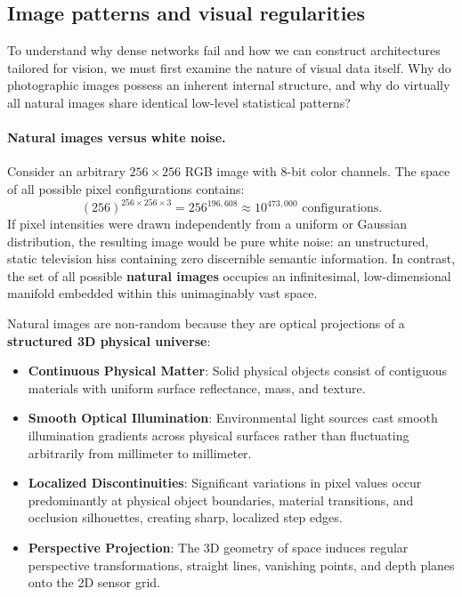 \subsection{Image patterns and visual regularities}
\label{sec:natural_image_statistics}

To understand why dense networks fail and how we can construct architectures tailored for vision, we must first examine the nature of visual data itself. Why do photographic images possess an inherent internal structure, and why do virtually all natural images share identical low-level statistical patterns?

\paragraph{Natural images versus white noise.}
Consider an arbitrary $256 \times 256$ RGB image with 8-bit color channels. The space of all possible pixel configurations contains:
\begin{equation}
(256)^{256 \times 256 \times 3} = 256^{196,608} \approx 10^{473,000} \text{ configurations}.
\end{equation}
If pixel intensities were drawn independently from a uniform or Gaussian distribution, the resulting image would be pure white noise: an unstructured, static television hiss containing zero discernible semantic information. In contrast, the set of all possible \textbf{natural images} occupies an infinitesimal, low-dimensional manifold embedded within this unimaginably vast space. 

Natural images are non-random because they are optical projections of a \textbf{structured 3D physical universe}:
\begin{itemize}[leftmargin=*]
  \item \textbf{Continuous Physical Matter}: Solid physical objects consist of contiguous materials with uniform surface reflectance, mass, and texture.
  \item \textbf{Smooth Optical Illumination}: Environmental light sources cast smooth illumination gradients across physical surfaces rather than fluctuating arbitrarily from millimeter to millimeter.
  \item \textbf{Localized Discontinuities}: Significant variations in pixel values occur predominantly at physical object boundaries, material transitions, and occlusion silhouettes, creating sharp, localized step edges.
  \item \textbf{Perspective Projection}: The 3D geometry of space induces regular perspective transformations, straight lines, vanishing points, and depth planes onto the 2D sensor grid.
\end{itemize}

